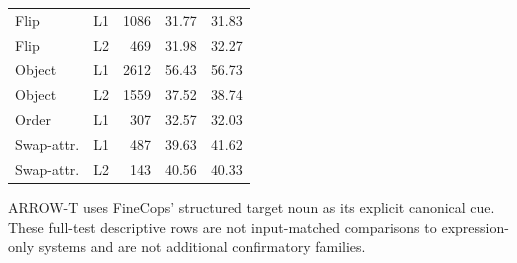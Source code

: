 \begin{table}[t]
\begin{minipage}[t]{0.48\textwidth}
\begin{tabular}{llrrr}
Flip & L1 & 1086 & 31.77 & 31.83 \\
Flip & L2 & 469 & 31.98 & 32.27 \\
Object & L1 & 2612 & 56.43 & 56.73 \\
Object & L2 & 1559 & 37.52 & 38.74 \\
Order & L1 & 307 & 32.57 & 32.03 \\
Swap-attr. & L1 & 487 & 39.63 & 41.62 \\
Swap-attr. & L2 & 143 & 40.56 & 40.33 \\
\bottomrule\end{tabular}
\end{minipage}
\parbox{0.97\textwidth}{\scriptsize ARROW-T uses FineCops' structured target noun as its explicit canonical cue. These full-test descriptive rows are not input-matched comparisons to expression-only systems and are not additional confirmatory families.}
\end{table}
